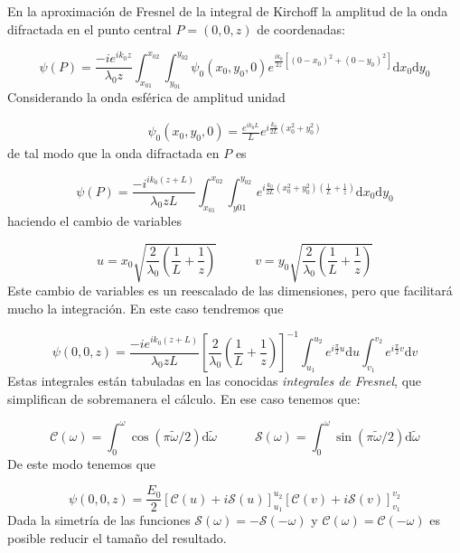 \documentclass[12pt,a4paper]{book}
\numberwithin{equation}{section}
\numberwithin{figure}{section}
\newcommand{\tquad}{\quad \quad \quad}
\newcommand{\parentesis}[1]{\left( #1  \right)}
\newcommand{\ccorchetes}[1]{\left[ #1  \right]}
\newcommand{\D}{\mathrm{d}}
\newcommand{\1}{_{(1)}}
\newcommand{\2}{_{(2)}}
\newcommand{\Ccal}{\mathcal{C}}
\newcommand{\Scal}{\mathcal{S}}
\theoremstyle{definition}
\begin{document}
En la aproximación de Fresnel de la integral de Kirchoff la amplitud de la onda difractada en el punto central $P=(0,0,z)$ de coordenadas:

\begin{equation}
    \psi (P) = \frac{-ie^{ik_0z}}{\lambda_0 z} \int_{x_{01}}^{x_{02}} \int_{y_{01}}^{y_{02}} \psi_0 (x_0,y_0,0) e^{\frac{ik_0}{2z}\ccorchetes{(0-x_0)^2+(0-y_0)^2}} \D x_0 \D y_0 
\end{equation}
Considerando la onda esférica de amplitud unidad

\begin{eqnarray}
    \psi_0 (x_0,y_0,0) = \frac{e^{ik_0L}}{L} e^{i\frac{k_0}{2L}\parentesis{x_0^2+y_0^2}}
\end{eqnarray}
de tal modo que la onda difractada en $P$ es

\begin{equation}
    \psi (P)= \frac{-i^{ik_0(z+L)}}{\lambda_0 z L}\int_{x_{01}}^{x_{02}} \int_{y{01}}^{y_{02}} e^{i\frac{k_0}{2L}\parentesis{x_0^2+y_0^2}\parentesis{\frac{1}{L}+\frac{1}{z}}} \D x_0 \D y_0
\end{equation}
haciendo el cambio de variables 

\begin{equation}
    u = x_0 \sqrt{\frac{2}{\lambda_0} \parentesis{\frac{1}{L} + \frac{1}{z}}}  \tquad v = y_0 \sqrt{\frac{2}{\lambda_0} \parentesis{\frac{1}{L}+\frac{1}{z}}}
\end{equation}
Este cambio de variables es un reescalado de las dimensiones, pero que facilitará mucho la integración. En este caso tendremos que


\begin{equation}
    \psi (0,0,z) = \frac{-ie^{ik_0(z+L)}}{\lambda_0 z L} \ccorchetes{\frac{2}{\lambda_0} \parentesis{\frac{1}{L} + \frac{1}{z}}}^{-1} \int_{u_1}^{u_2} e^{i\frac{\pi}{2}u} \D u \int_{v_1}^{v_2}e^{i\frac{\pi}{2}v} \D v
\end{equation}
Estas integrales están tabuladas en las conocidas \textit{integrales de Fresnel}, que simplifican de sobremanera el cálculo. En ese caso tenemos que:

\begin{equation}
     \Ccal (\omega) = \int_0^\omega \cos (\pi \tilde{\omega}/2) \D \tilde{\omega} \tquad     \Scal (\omega) = \int_0^\omega \sin (\pi \tilde{\omega}/2) \D \tilde{\omega}
\end{equation}
De este modo tenemos que

\begin{equation}
    \psi (0,0,z) = \frac{E_0}{2} \ccorchetes{\Ccal (u) + i\Scal (u)}_{u_1}^{u_2} \ccorchetes{\Ccal (v) + i \Scal (v)}_{v_1}^{v_2}
\end{equation}
Dada la simetría de las funciones $\Scal(\omega)=-\Scal(-\omega)$ y $\Ccal(\omega)=\Ccal(-\omega)$ es posible reducir el tamaño del resultado. 
\end{document}
